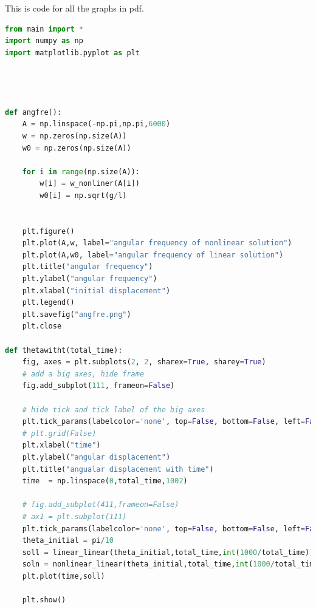 \documentclass[11pt,a4paper]{article}
\begin{document}
This is code for all the graphs in pdf.
\begin{lstlisting}[language=Python]
    from main import *
import numpy as np
import matplotlib.pyplot as plt




def angfre():
    A = np.linspace(-np.pi,np.pi,6000)
    w = np.zeros(np.size(A))
    w0 = np.zeros(np.size(A))

    for i in range(np.size(A)):
        w[i] = w_nonliner(A[i])
        w0[i] = np.sqrt(g/l)

    
    plt.figure()
    plt.plot(A,w, label="angular frequency of nonlinear solution")
    plt.plot(A,w0, label="angular frequency of linear solution")
    plt.title("angular frequency")
    plt.ylabel("angular frequency")
    plt.xlabel("initial displacement")
    plt.legend()
    plt.savefig("angfre.png")
    plt.close
    
def thetawitht(total_time):
    fig, axes = plt.subplots(2, 2, sharex=True, sharey=True)
    # add a big axes, hide frame
    fig.add_subplot(111, frameon=False)
    
    # hide tick and tick label of the big axes
    plt.tick_params(labelcolor='none', top=False, bottom=False, left=False, right=False)
    # plt.grid(False)
    plt.xlabel("time")
    plt.ylabel("angular displacement")
    plt.title("angualar displacement with time")
    time  = np.linspace(0,total_time,1002)

    # fig.add_subplot(411,frameon=False)
    # ax1 = plt.subplot(111)
    plt.tick_params(labelcolor='none', top=False, bottom=False, left=False, right=False)
    theta_initial = pi/10
    soll = linear_linear(theta_initial,total_time,int(1000/total_time))
    soln = nonlinear_linear(theta_initial,total_time,int(1000/total_time))
    plt.plot(time,soll)
    
    plt.show()

  \end{lstlisting}
\end{document}
